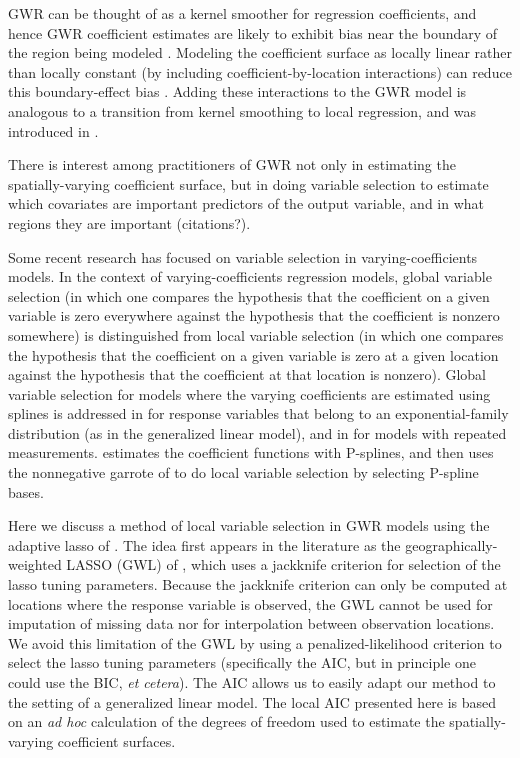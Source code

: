 \documentclass[authoryear, review, 11pt]{elsarticle}
\begin{document}
	GWR can be thought of as a kernel smoother for regression coefficients, and hence GWR coefficient estimates are likely to exhibit bias near the boundary of the region being modeled \citep{Hastie:1993b}. Modeling the coefficient surface as locally linear rather than locally constant (by including coefficient-by-location interactions) can reduce this boundary-effect bias \citep{Hastie:1993b}. Adding these interactions to the GWR model is analogous to a transition from kernel smoothing to local regression, and was introduced in \cite{Wang:2008b}.
	
	There is interest among practitioners of GWR not only in estimating the spatially-varying coefficient surface, but in doing variable selection to estimate which covariates are important predictors of the output variable, and in what regions they are important (citations?).
	
	Some recent research has focused on variable selection in varying-coefficients models. In the context of varying-coefficients regression models, global variable selection (in which one compares the hypothesis that the coefficient on a given variable is zero everywhere against the hypothesis that the coefficient is nonzero somewhere) is distinguished from local variable selection (in which one compares the hypothesis that the coefficient on a given variable is zero at a given location against the hypothesis that the coefficient at that location is nonzero). Global variable selection for models where the varying coefficients are estimated using splines is addressed in \cite{Fan:1999} for response variables that belong to an exponential-family distribution (as in the generalized linear model), and in \cite{Wang:2008a} for models with repeated measurements. \cite{Antoniadis:2012a} estimates the coefficient functions with P-splines, and then uses the nonnegative garrote of \cite{Breiman:1995} to do local variable selection by selecting P-spline bases.
	
	Here we discuss a method of local variable selection in GWR models using the adaptive lasso of \cite{Zou:2006}. The idea first appears in the literature as the geographically-weighted LASSO (GWL) of \cite{Wheeler:2009}, which uses a jackknife criterion for selection of the lasso tuning parameters. Because the jackknife criterion can only be computed at locations where the response variable is observed, the GWL cannot be used for imputation of missing data nor for interpolation between observation locations. We avoid this limitation of the GWL by using a penalized-likelihood criterion to select the lasso tuning parameters (specifically the AIC, but in principle one could use the BIC, \emph{et cetera}). The AIC allows us to easily adapt our method to the setting of a generalized linear model. The local AIC presented here is based on an \emph{ad hoc} calculation of the degrees of freedom used to estimate the spatially-varying coefficient surfaces.
	
\end{document}

